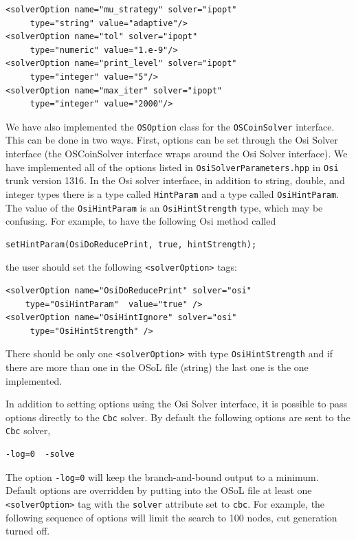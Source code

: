\documentclass[11pt]{article}
\renewcommand{\_}{{\char"5F}}
\renewcommand{\{}{{\char"7B}}
\renewcommand{\}}{{\char"7D}}
\renewcommand{\^}{{\char"0D}}
\renewcommand{\'}{{\char"0D}}
\begin{document}
\begin{enumerate}[Step 1:]
\begin{verbatim}
<solverOption name="mu_strategy" solver="ipopt" 
     type="string" value="adaptive"/>
<solverOption name="tol" solver="ipopt" 
     type="numeric" value="1.e-9"/>
<solverOption name="print_level" solver="ipopt" 
     type="integer" value="5"/>
<solverOption name="max_iter" solver="ipopt" 
     type="integer" value="2000"/>
\end{verbatim}

We have also implemented the {\tt OSOption} class for the {\tt OSCoinSolver} interface. This can be done in two ways. 
First, options can be set through the Osi Solver interface (the OSCoinSolver interface wraps around the Osi Solver interface).    
We have implemented all of the options listed in {\tt OsiSolverParameters.hpp} in {\tt Osi} trunk version 1316.  
In the Osi solver interface, in addition to string, double, and integer types  there is a type called {\tt HintParam}
and a type called {\tt OsiHintParam}. The value of the {\tt OsiHintParam} is an {\tt OsiHintStrength} type, 
which may be confusing. For example, to have the following Osi method called

\begin{verbatim}
setHintParam(OsiDoReducePrint, true, hintStrength);
\end{verbatim}


the user should set the following {\tt <solverOption>} tags:
\begin{verbatim}
<solverOption name="OsiDoReducePrint" solver="osi" 
    type="OsiHintParam"  value="true" />
<solverOption name="OsiHintIgnore" solver="osi" 
     type="OsiHintStrength" />
\end{verbatim}
There should be only one {\tt <solverOption>} with type {\tt OsiHintStrength} and if there are more than one in the 
OSoL file (string) the last one is the one implemented. 

In addition to setting options using the Osi  Solver interface, it is possible to pass options directly to the {\tt Cbc} 
solver. By default the following options are sent to the {\tt Cbc} solver,

\begin{verbatim}
-log=0  -solve 
\end{verbatim}
The option {\tt -log=0} will keep the branch-and-bound output to a minimum.  Default options are overridden by 
putting into the OSoL file at least one {\tt <solverOption>} tag with the {\tt solver} attribute 
set to {\tt cbc}.    For example, the following sequence of options will limit the search to 100 nodes, 
cut generation turned off.


\end{enumerate}
\end{document}
